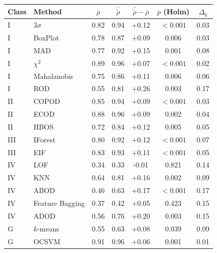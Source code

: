 \begin{tabular}{llccccc}
\hline
\textbf{Class} & \textbf{Method} & $\bar\rho$ & $\bar{\tilde\rho}$ & $\bar{\tilde\rho}-\bar\rho$ & $p$ (Holm) & $\Delta_q$ \\
\hline
I & $3\sigma$ & 0.82 & 0.94 & +0.12 & $<0.001$ & 0.03 \\
I & BoxPlot & 0.78 & 0.87 & +0.09 & 0.006 & 0.03 \\
I & MAD & 0.77 & 0.92 & +0.15 & 0.001 & 0.08 \\
I & $\chi^2$ & 0.89 & 0.96 & +0.07 & $<0.001$ & 0.02 \\
I & Mahalanobis & 0.75 & 0.86 & +0.11 & 0.006 & 0.06 \\
I & ROD & 0.55 & 0.81 & +0.26 & 0.003 & 0.17 \\
II & COPOD & 0.85 & 0.94 & +0.09 & $<0.001$ & 0.03 \\
II & ECOD & 0.88 & 0.96 & +0.09 & 0.002 & 0.04 \\
II & HBOS & 0.72 & 0.84 & +0.12 & 0.005 & 0.05 \\
III & IForest & 0.80 & 0.92 & +0.12 & $<0.001$ & 0.07 \\
III & EIF & 0.83 & 0.93 & +0.11 & $<0.001$ & 0.05 \\
IV & LOF & 0.34 & 0.33 & -0.01 & 0.821 & 0.14 \\
IV & KNN & 0.64 & 0.81 & +0.16 & 0.002 & 0.09 \\
IV & ABOD & 0.46 & 0.63 & +0.17 & $<0.001$ & 0.17 \\
IV & Feature Bagging & 0.37 & 0.42 & +0.05 & 0.423 & 0.15 \\
IV & ADOD & 0.56 & 0.76 & +0.20 & 0.003 & 0.15 \\
G & $k$-means & 0.55 & 0.63 & +0.08 & 0.039 & 0.09 \\
G & OCSVM & 0.91 & 0.96 & +0.06 & 0.001 & 0.01 \\
\hline
\end{tabular}
